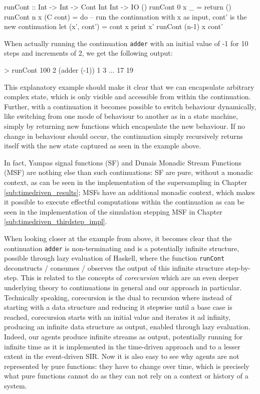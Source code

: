 \begin{HaskellCode}
runCont :: Int -> Int -> Cont Int Int -> IO ()
runCont 0 x _ = return () 
runCont n x (C cont) = do 
  -- run the continuation with x as input, cont' is the new continuation
  let (x', cont') = cont x
  print x'
  runCont (n-1) x cont' 
\end{HaskellCode}

When actually running the continuation \texttt{adder} with an initial value of -1 for 10 steps and increments of 2, we get the following output:

\begin{HaskellCode}
> runCont 100 2 (adder (-1))
1
3
...
17
19
\end{HaskellCode}

This explanatory example should make it clear that we can encapsulate arbitrary complex state, which is only visible and accessible from within the continuation. Further, with a continuation it becomes possible to switch behaviour dynamically, like switching from one mode of behaviour to another as in a state machine, simply by returning new functions which encapsulate the new behaviour. If no change in behaviour should occur, the continuation simply recursively returns itself with the new state captured as seen in the example above.

In fact, Yampas signal functions (SF) and Dunais Monadic Stream Functions (MSF) are nothing else than such continuations: SF are pure, without a monadic context, as can be seen in the implementation of the supersampling in Chapter \ref{sub:timedriven_results}; MSFs have an additional monadic context, which makes it possible to execute effectful computations within the continuation as can be seen in the implementation of the simulation stepping MSF in Chapter \ref{sub:timedriven_thirdstep_impl}. 

\medskip

When looking closer at the example from above, it becomes clear that the continuation \texttt{adder} is non-terminating and is a potentially infinite structure, possible through lazy evaluation of Haskell, where the function \texttt{runCont} deconstructs / consumes / observes the output of this infinite structure step-by-step. This is related to the concepts of \textit{corecursion} which are an even deeper underlying theory to continuations in general and our approach in particular. Technically speaking, corecursion is the dual to recursion where instead of starting with a data structure and reducing it stepwise until a base case is reached, corecursion starts with an initial value and iterates it ad infinity, producing an infinite data structure as output, enabled through lazy evaluation. 
Indeed, our agents produce infinite streams as output, potentially running for infinite time as it is implemented in the time-driven approach and to a lesser extent in the event-driven SIR. Now it is also easy to see why agents are not represented by pure functions: they have to change over time, which is precisely what pure functions cannot do as they can not rely on a context or history of a system.

